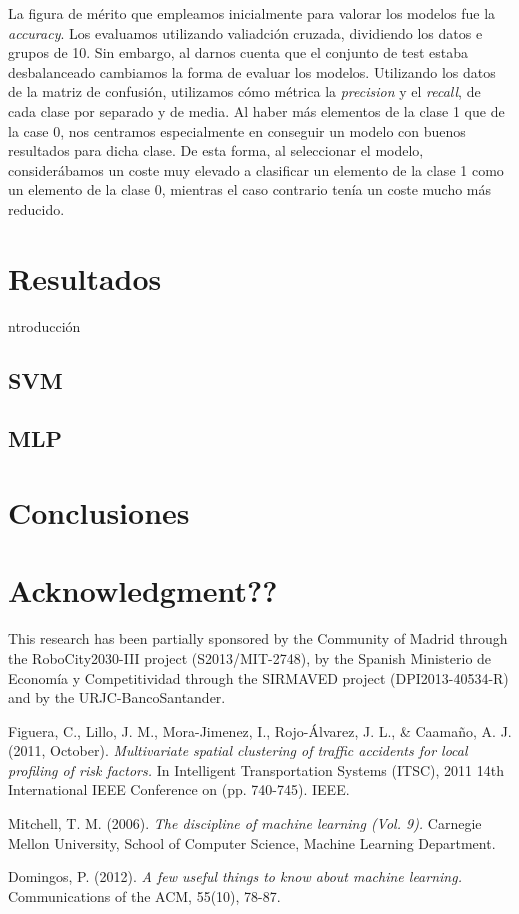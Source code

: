 \documentclass[journal,twoside]{JoPhA}
\begin{document}
La figura de mérito que empleamos inicialmente para valorar los modelos fue la \textit{accuracy}. Los evaluamos utilizando valiadción cruzada, dividiendo los datos e grupos de 10. Sin embargo, al darnos cuenta que el conjunto de test estaba desbalanceado cambiamos la forma de evaluar los modelos. Utilizando los datos de la matriz de confusión, utilizamos cómo métrica la \textit{precision} y el \textit{recall}, de cada clase por separado y de media. Al haber más elementos de la clase 1 que de la case 0, nos centramos especialmente en conseguir un modelo con buenos resultados para dicha clase. De esta forma, al seleccionar el modelo, considerábamos un coste muy elevado a clasificar un elemento de la clase 1 como un elemento de la clase 0, mientras el caso contrario tenía un coste mucho más reducido. \\



\section{Resultados}
ntroducción
	\subsection{SVM}

	\subsection{MLP}


\section{Conclusiones}

\section*{Acknowledgment??}
This  research  has  been  partially  sponsored  by  the Community of Madrid through the RoboCity2030-III project (S2013/MIT-2748), by the Spanish Ministerio de Economía y Competitividad through the SIRMAVED project (DPI2013-40534-R) and by the URJC-BancoSantander.

\begin{thebibliography}{1}

Figuera, C., Lillo, J. M., Mora-Jimenez, I., Rojo-Álvarez, J. L., \& Caamaño, A. J. (2011, October). \emph{Multivariate spatial clustering of traffic accidents for local profiling of risk factors.} In Intelligent Transportation Systems (ITSC), 2011 14th International IEEE Conference on (pp. 740-745). IEEE.

Mitchell, T. M. (2006). \emph{The discipline of machine learning (Vol. 9).} Carnegie Mellon University, School of Computer Science, Machine Learning Department.

Domingos, P. (2012). \emph{A few useful things to know about machine learning.} Communications of the ACM, 55(10), 78-87.

\end{thebibliography}
\end{document}
